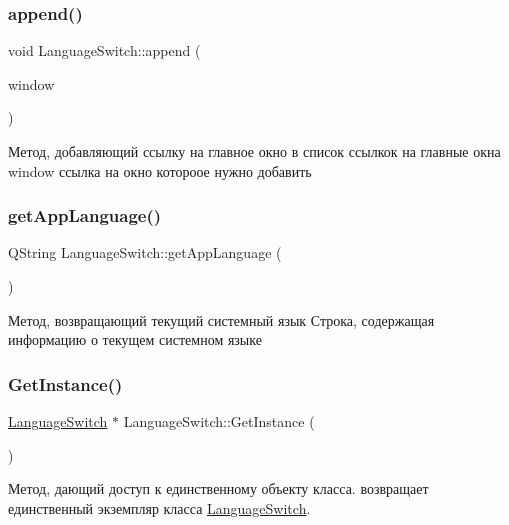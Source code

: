 \subsubsection{\texorpdfstring{append()}{append()}}
{\footnotesize\ttfamily void Language\+Switch\+::append (\begin{DoxyParamCaption}\item[{\mbox{\hyperlink{class_main_window}{Main\+Window}} $\ast$}]{window }\end{DoxyParamCaption})}

Метод, добавляющий ссылку на главное окно в список ссылкок на главные окна window ссылка на окно котороое нужно добавить \mbox{\label{class_language_switch_a64444b644fb7f7a0612998d40928a8fc}} 
\subsubsection{\texorpdfstring{getAppLanguage()}{getAppLanguage()}}
{\footnotesize\ttfamily Q\+String Language\+Switch\+::get\+App\+Language (\begin{DoxyParamCaption}{ }\end{DoxyParamCaption})}

Метод, возвращающий текущий системный язык Строка, содержащая информацию о текущем системном языке \mbox{\label{class_language_switch_a3fb95c9db6175a4911766462bb141ec9}} 
\subsubsection{\texorpdfstring{GetInstance()}{GetInstance()}}
{\footnotesize\ttfamily \mbox{\hyperlink{class_language_switch}{Language\+Switch}} $\ast$ Language\+Switch\+::\+Get\+Instance (\begin{DoxyParamCaption}\item[{void}]{ }\end{DoxyParamCaption})\hspace{0.3cm}{\ttfamily [static]}}

Метод, дающий доступ к единственному объекту класса. возвращает единственный экземпляр класса \mbox{\hyperlink{class_language_switch}{Language\+Switch}}. \mbox{\label{class_language_switch_abbeea6d84e165377ab4d2707d013ad8f}} 
